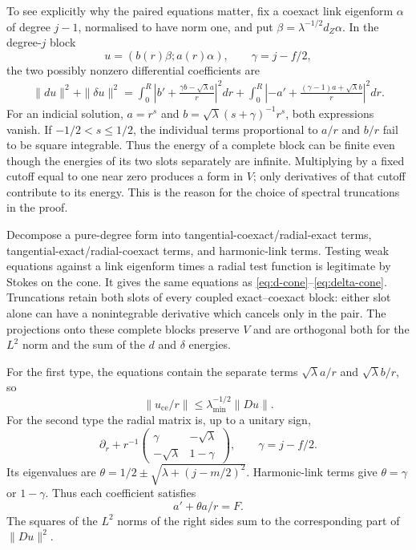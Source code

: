 To see explicitly why the paired equations matter, fix a coexact
link eigenform $\alpha$ of degree $j-1$, normalised to have norm
one, and put $\beta=\lambda^{-1/2}d_Z\alpha$. In the
degree-$j$ block
\[
 u=(b(r)\beta;a(r)\alpha),\qquad \gamma=j-f/2,
\]
the two possibly nonzero differential coefficients are
\begin{equation}\label{eq:coupled-energy}
 \begin{split}
 \|du\|^2+\|\delta u\|^2
 =\int_0^R\left|b'+\frac{\gamma b-\sqrt\lambda a}{r}\right|^2dr
 +\int_0^R\left|-a'+\frac{(\gamma-1)a+\sqrt\lambda b}{r}\right|^2dr.
 \end{split}
\end{equation}
For an indicial solution, $a=r^s$ and
$b=\sqrt\lambda(s+\gamma)^{-1}r^s$, both expressions
vanish. If $-1/2<s\le1/2$, the individual terms proportional
to $a/r$ and $b/r$ fail to be square integrable. Thus the energy
of a complete block can be finite even though the energies of its
two slots separately are infinite. Multiplying by a fixed cutoff
equal to one near zero produces a form in $V$; only derivatives
of that cutoff contribute to its energy. This is the reason for
the choice of spectral truncations in the proof.

Decompose a pure-degree form into tangential-coexact/radial-exact
terms, tangential-exact/radial-coexact terms, and harmonic-link
terms. Testing weak equations against a link eigenform times a
radial test function is legitimate by Stokes on the cone. It gives
the same equations as \eqref{eq:d-cone}--\eqref{eq:delta-cone}.
Truncations retain both slots of every coupled exact--coexact
block: either slot alone can have a nonintegrable derivative
which cancels only in the pair. The projections onto these
complete blocks preserve $V$ and are orthogonal both for the
$L^2$ norm and the sum of the $d$ and $\delta$ energies.

For the first type, the equations contain the separate terms
$\sqrt\lambda a/r$ and $\sqrt\lambda b/r$, so
\begin{equation}\label{eq:coexact-hardy}
 \|u_{\mathrm{ce}}/r\|\le\lambda_{\min}^{-1/2}\|Du\|.
\end{equation}
For the second type the radial matrix is, up to a unitary sign,
\[
 \partial_r+r^{-1}
 \begin{pmatrix}\gamma&-\sqrt\lambda\\-\sqrt\lambda&1-\gamma\end{pmatrix},
 \qquad \gamma=j-f/2.
\]
Its eigenvalues are
$\theta=1/2\pm\sqrt{\lambda+(j-m/2)^2}$.
Harmonic-link terms give $\theta=\gamma$ or $1-\gamma$.
Thus each coefficient satisfies
\begin{equation}\label{eq:scalar}
 a'+\theta a/r=F.
\end{equation}
The squares of the $L^2$ norms of the right sides sum to the
corresponding part of $\|Du\|^2$.

